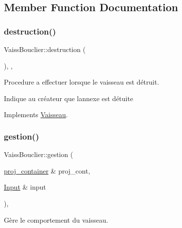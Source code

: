 \subsection{Member Function Documentation}
\mbox{\label{class_vaiss_bouclier_ab154712cec76a589fd8bce2392982c5b}} 
\subsubsection{\texorpdfstring{destruction()}{destruction()}}
{\footnotesize\ttfamily Vaiss\+Bouclier\+::destruction (\begin{DoxyParamCaption}{ }\end{DoxyParamCaption})\hspace{0.3cm}{\ttfamily [inline]}, {\ttfamily [override]}, {\ttfamily [virtual]}}



Procedure a effectuer lorsque le vaisseau est détruit. 

Indique au créateur que l\textquotesingle{}annexe est détuite 

Implements \mbox{\hyperlink{class_vaisseau_a6d7506acb12c0367989066c899ec7949}{Vaisseau}}.

\mbox{\label{class_vaiss_bouclier_a03ba45dff79711b32db64d01ab7ff90b}} 
\subsubsection{\texorpdfstring{gestion()}{gestion()}}
{\footnotesize\ttfamily Vaiss\+Bouclier\+::gestion (\begin{DoxyParamCaption}\item[{\mbox{\hyperlink{def__type_8h_a87980cd8ee9533e561a73e8bbc728188}{proj\+\_\+container}} \&}]{proj\+\_\+cont,  }\item[{\mbox{\hyperlink{_input_8h_a5588d60d674991c719a8df848313e966}{Input}} \&}]{input }\end{DoxyParamCaption})\hspace{0.3cm}{\ttfamily [override]}, {\ttfamily [virtual]}}



Gère le comportement du vaisseau. 


